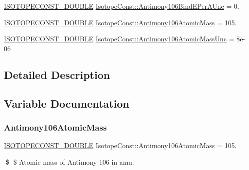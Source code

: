 \begin{DoxyCompactItemize}
\mbox{\hyperlink{group___isotope_const-_macros_ga8f45a7272ce02c0b4c65c44636ed719a}{I\+S\+O\+T\+O\+P\+E\+C\+O\+N\+S\+T\+\_\+\+D\+O\+U\+B\+LE}} \mbox{\hyperlink{group___isotope_const-_antimony-_sb106_ga5c26e4dee167e66080eda870c72a8a3f}{Isotope\+Const\+::\+Antimony106\+Bind\+E\+Per\+A\+Unc}} = 0.
\item 
\mbox{\hyperlink{group___isotope_const-_macros_ga8f45a7272ce02c0b4c65c44636ed719a}{I\+S\+O\+T\+O\+P\+E\+C\+O\+N\+S\+T\+\_\+\+D\+O\+U\+B\+LE}} \mbox{\hyperlink{group___isotope_const-_antimony-_sb106_ga4322177e21cb561c651833ff06ba5dd1}{Isotope\+Const\+::\+Antimony106\+Atomic\+Mass}} = 105.
\item 
\mbox{\hyperlink{group___isotope_const-_macros_ga8f45a7272ce02c0b4c65c44636ed719a}{I\+S\+O\+T\+O\+P\+E\+C\+O\+N\+S\+T\+\_\+\+D\+O\+U\+B\+LE}} \mbox{\hyperlink{group___isotope_const-_antimony-_sb106_ga69c1e9e29fa578621a22bcf020e4bd76}{Isotope\+Const\+::\+Antimony106\+Atomic\+Mass\+Unc}} = 8e-\/06
\end{DoxyCompactItemize}


\subsection{Detailed Description}


\subsection{Variable Documentation}
\mbox{\label{group___isotope_const-_antimony-_sb106_ga4322177e21cb561c651833ff06ba5dd1}} 
\subsubsection{\texorpdfstring{Antimony106\+Atomic\+Mass}{Antimony106AtomicMass}}
{\footnotesize\ttfamily \mbox{\hyperlink{group___isotope_const-_macros_ga8f45a7272ce02c0b4c65c44636ed719a}{I\+S\+O\+T\+O\+P\+E\+C\+O\+N\+S\+T\+\_\+\+D\+O\+U\+B\+LE}} Isotope\+Const\+::\+Antimony106\+Atomic\+Mass = 105.}

\$ \$ Atomic mass of Antimony-\/106 in amu. \mbox{\label{group___isotope_const-_antimony-_sb106_ga69c1e9e29fa578621a22bcf020e4bd76}} 
